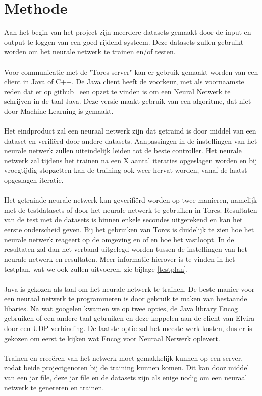 \documentclass{article}
\begin{document}
\pagebreak
\pagebreak

\pagebreak
\section{Methode}
Aan het begin van het project zijn meerdere datasets gemaakt door de input en output te loggen van een goed rijdend systeem. Deze datasets zullen gebruikt worden om het neurale netwerk te trainen en/of testen.\\\\
Voor communicatie met de "Torcs server" kan er gebruik gemaakt worden van een client in Java of C++. De Java client heeft de voorkeur, met als voornaamste reden dat er op github~\cite{java-client} een opzet te vinden is om een Neural Netwerk te schrijven in de taal Java. Deze versie maakt gebruik van een algoritme, dat niet door Machine Learning is gemaakt. \\\\
Het eindproduct zal een neuraal netwerk zijn dat getraind is door middel van een dataset en verifi\"erd door andere datasets. Aanpassingen in de instellingen van het neurale netwerk zullen uiteindelijk leiden tot de beste controller. Het neurale netwerk zal tijdens het trainen na een X aantal iteraties opgeslagen worden en bij vroegtijdig stopzetten kan de training ook weer hervat worden, vanaf de laatst opgeslagen iteratie. \\\\
Het getrainde neurale netwerk kan geverifi\"erd worden op twee manieren, namelijk met de testdatasets of door het neurale netwerk te gebruiken in Torcs. Resultaten van de test met de datasets is binnen enkele secondes uitgerekend en kan het eerste onderscheid geven. Bij het gebruiken van Torcs is duidelijk te zien hoe het neurale netwerk reageert op de omgeving en of en hoe het vastloopt. In de resultaten zal dan het verband uitgelegd worden tussen de instellingen van het neurale netwerk en resultaten. Meer informatie hierover is te vinden in het testplan, wat we ook zullen uitvoeren, zie bijlage \ref{testplan}. \\\\
Java is gekozen als taal om het neurale netwerk te trainen. De beste manier voor een neuraal netwerk te programmeren is door gebruik te maken van bestaande libaries. Na wat googelen kwamen we op twee opties, de Java library Encog gebruiken\cite{encog} of een andere taal gebruiken en deze koppelen aan de client van Elvira door een UDP-verbinding. De laatste optie zal het meeste werk kosten, dus er is gekozen om eerst te kijken wat Encog voor Neuraal Netwerk oplevert.
\\\\
Trainen en cree\"eren van het netwerk moet gemakkelijk kunnen op een server, zodat beide projectgenoten bij de training kunnen komen. Dit kan door middel van een jar file, deze jar file en de datasets zijn als enige nodig om een neuraal netwerk te genereren en trainen.
\pagebreak
\end{document}
